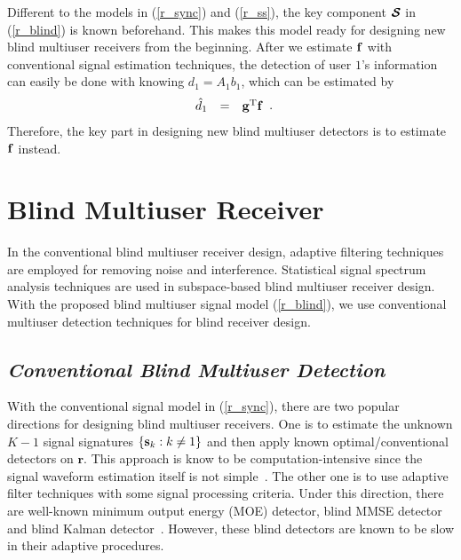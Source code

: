 \documentclass[a4paper,10pt,fleqn, twocolumn]{IEEETran}
\newcommand{\br}{{\mathbf r}}
\newcommand{\bg}{{\bf g}}
\newcommand{\bs}{{\bf s}}
\newcommand{\bbf}{{\bf f}}
\newcommand{\bcS}{{\mbox {\boldmath ${\cal S}$}}}
\begin{document}
Different to the models in (\ref{r_sync}) and (\ref{r_ss}), the
key component $\bcS$ in (\ref{r_blind}) is known beforehand. This
makes this model ready for designing new blind multiuser receivers
from the beginning. After we estimate $\bbf$ with conventional
signal estimation techniques, the detection of user $1$'s
information can easily be done with knowing $d_1=A_1b_1$, which
can be estimated by
\begin{equation}
\begin{array}{rcl}
\hat{d}_{1} &=&\bg^{\rm T}\bbf
\end{array}.\label{d_1}
\end{equation}
\noindent Therefore, the key part in designing new blind multiuser
detectors is to estimate $\bbf$ instead.
\section{Blind Multiuser Receiver}
In the conventional blind multiuser receiver design, adaptive
filtering techniques are employed for removing noise and
interference. Statistical signal spectrum analysis techniques are
used in subspace-based blind multiuser receiver design. With the
proposed blind multiuser signal model (\ref{r_blind}), we use
conventional multiuser detection techniques for blind receiver
design.
\subsection{\em Conventional Blind Multiuser Detection}
With the conventional signal model in (\ref{r_sync}), there are
two popular directions for designing blind multiuser receivers.
One is to estimate the unknown $K-1$ signal signatures
$\left\{\bs_k:k\neq1\right\}$ and then apply known
optimal/conventional detectors on $\br$. This approach is know to
be computation-intensive since the signal waveform estimation
itself is not simple~\cite{Torl97}. The other one is to use
adaptive filter techniques with some signal processing criteria.
Under this direction, there are well-known minimum output energy
(MOE) detector, blind MMSE detector and blind Kalman
detector~\cite{Honi95,Verd98,Zhang02}. However, these blind
detectors are known to be slow in their adaptive procedures.
\end{document}
